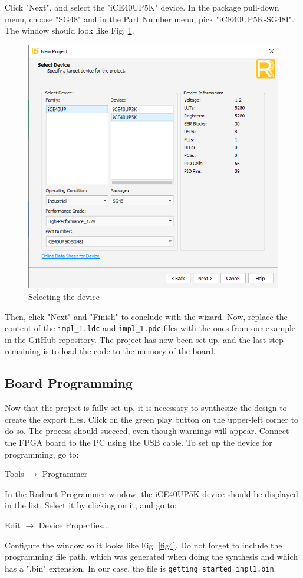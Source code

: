 \documentclass[11pt, a4paper, oneside]{article}
\begin{document}
Click "Next", and select the "iCE40UP5K" device. In the package pull-down menu, choose "SG48" and in the Part Number menu, pick "iCE40UP5K-SG48I". The window should look like Fig. \ref{fig3}.

\begin{figure}[h!]
	\centering
	\includegraphics[scale=0.71]{figs/fig3.png}
	\caption{Selecting the device}
	\label{fig3}
\end{figure}

Then, click "Next" and "Finish" to conclude with the wizard. Now, replace the content of the \texttt{impl\_1.ldc}  and \texttt{impl\_1.pdc} files with the ones from our example in the GitHub repository. The project has now been set up, and the last step remaining is to load the code to the memory of the board.

\subsection{Board Programming}
Now that the project is fully set up, it is necessary to synthesize the design to create the export files. Click on the green play button on the upper-left corner to do so. The process should succeed, even though warnings will appear. Connect the FPGA board to the PC using the USB cable. To set up the device for programming, go to:
\begin{center}
	Tools $\rightarrow$ Programmer
\end{center}
In the Radiant Programmer window, the iCE40UP5K device should be displayed in the list. Select it by clicking on it, and go to:
\begin{center}
	Edit $\rightarrow$ Device Properties...
\end{center}
Configure the window so it looks like Fig. \ref{fig4}. Do not forget to include the programming file path, which was generated when doing the synthesis and which has a ".bin" extension. In our case, the file is \texttt{getting\_started\_impl1.bin}.
\end{document}
